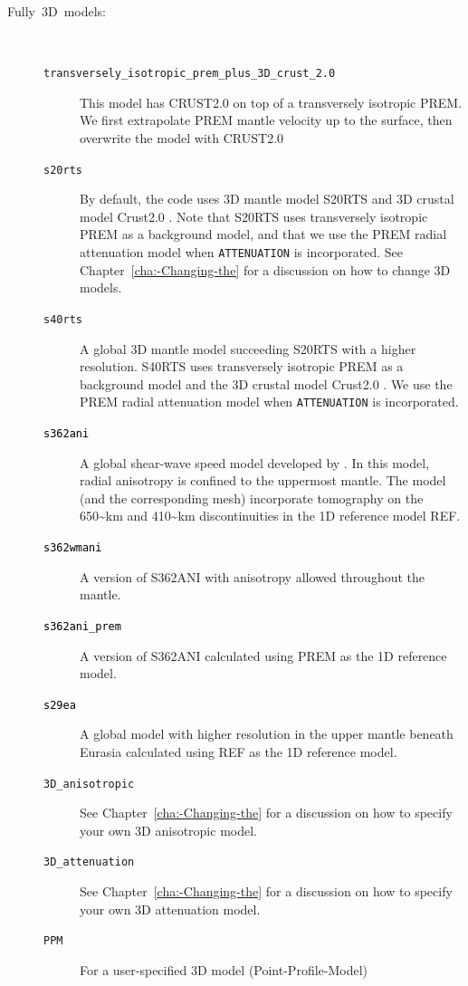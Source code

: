 \documentclass[oneside,english]{book}
\begin{document}
\begin{description}
\item [{\textmd{Fully~3D~models:}}]~

\begin{description}
\item [{\texttt{transversely\_isotropic\_prem\_plus\_3D\_crust\_2.0}}] This
model has CRUST2.0 \citep{BaLaMa00} on top of a transversely isotropic
PREM. We first extrapolate PREM mantle velocity up to the surface,
then overwrite the model with CRUST2.0
\item [{\texttt{s20rts}}] By default, the code uses 3D mantle model S20RTS
\citep{RiVaWo99} and 3D crustal model Crust2.0 \citep{BaLaMa00}.
Note that S20RTS uses transversely isotropic PREM as a background
model, and that we use the PREM radial attenuation model when \texttt{ATTENUATION}
is incorporated. See Chapter~\ref{cha:-Changing-the} for a discussion
on how to change 3D models.
\item [{\texttt{s40rts}}] A global 3D mantle model \citep{RiDeVaWo10} succeeding S20RTS
with a higher resolution.
S40RTS uses transversely isotropic PREM as a background
model and the 3D crustal model Crust2.0 \citep{BaLaMa00}.
We use the PREM radial attenuation model when \texttt{ATTENUATION}
is incorporated.
\item [{\texttt{\textcolor{black}{s362ani}}}] A global shear-wave speed
model developed by \citet{KuDzEk06}. In this model, radial anisotropy
is confined to the uppermost mantle. The model (and the corresponding
mesh) incorporate tomography on the 650\textasciitilde{}km and 410\textasciitilde{}km
discontinuities in the 1D reference model REF.
\item [{\texttt{\textcolor{black}{s362wmani}}}] A version of S362ANI with
anisotropy allowed throughout the mantle.
\item [{\texttt{\textcolor{black}{s362ani\_prem}}}] A version of S362ANI
calculated using PREM as the 1D reference model.
\item [{\texttt{\textcolor{black}{s29ea}}}] A global model with higher
resolution in the upper mantle beneath Eurasia calculated using REF
as the 1D reference model.
\item [{\texttt{3D\_anisotropic}}] See Chapter~\ref{cha:-Changing-the}
for a discussion on how to specify your own 3D anisotropic model.
\item [{\texttt{3D\_attenuation}}] See Chapter~\ref{cha:-Changing-the}
for a discussion on how to specify your own 3D attenuation model.
\item [{\texttt{PPM}}] For a user-specified 3D model (Point-Profile-Model)

\end{description}
\end{description}
\end{document}
